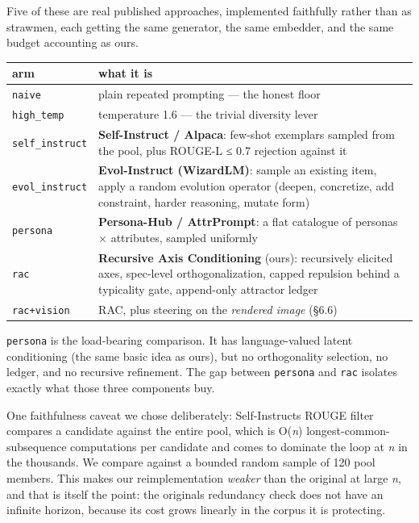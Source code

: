 \documentclass[
  11pt,
]{article}
\theoremstyle{plain}
\theoremstyle{definition}
\begin{document}
Five of these are real published approaches, implemented faithfully
rather than as strawmen, each getting the same generator, the same
embedder, and the same budget accounting as ours.

\begin{longtable}[]{@{}ll@{}}
\toprule\noalign{}
arm & what it is \\
\midrule\noalign{}
\endhead
\bottomrule\noalign{}
\endlastfoot
\texttt{naive} & plain repeated prompting --- the honest floor \\
\texttt{high\_temp} & temperature 1.6 --- the trivial diversity lever \\
\texttt{self\_instruct} & \textbf{Self-Instruct / Alpaca}: few-shot
exemplars sampled from the pool, plus ROUGE-L ≤ 0.7 rejection against
it \\
\texttt{evol\_instruct} & \textbf{Evol-Instruct (WizardLM)}: sample an
existing item, apply a random evolution operator (deepen, concretize,
add constraint, harder reasoning, mutate form) \\
\texttt{persona} & \textbf{Persona-Hub / AttrPrompt}: a flat catalogue
of personas × attributes, sampled uniformly \\
\texttt{rac} & \textbf{Recursive Axis Conditioning} (ours): recursively
elicited axes, spec-level orthogonalization, capped repulsion behind a
typicality gate, append-only attractor ledger \\
\texttt{rac+vision} & RAC, plus steering on the \emph{rendered image}
(§6.6) \\
\end{longtable}

\texttt{persona} is the load-bearing comparison. It has language-valued
latent conditioning (the same basic idea as ours), but no orthogonality
selection, no ledger, and no recursive refinement. The gap between
\texttt{persona} and \texttt{rac} isolates exactly what those three
components buy.

One faithfulness caveat we chose deliberately:
Self-Instruct\textquotesingle s ROUGE filter compares a candidate
against the entire pool, which is O(\emph{n}) longest-common-subsequence
computations per candidate and comes to dominate the loop at \emph{n} in
the thousands. We compare against a bounded random sample of 120 pool
members. This makes our reimplementation \emph{weaker} than the original
at large \emph{n}, and that is itself the point: the
original\textquotesingle s redundancy check does not have an infinite
horizon, because its cost grows linearly in the corpus it is protecting.
\end{document}
